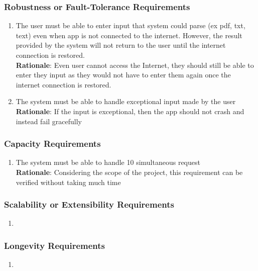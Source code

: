 \subsubsection{Robustness or Fault-Tolerance Requirements}
\label{ssub:robustness_or_fault_tolerance_requirements}
\begin{enumerate}[{PR-RFT}1. ]
	\item The user must be able to enter input that system could parse (ex pdf, txt, text) even when app is not connected to the internet. However, the result provided by the system will not return to the user until the internet connection is restored.\\ \textbf{Rationale}: Even user cannot access the Internet, they should still be able to enter they input as they would not have to enter them again once the internet connection is restored.
	\item The system must be able to handle exceptional input made by the user\\ \textbf{Rationale}: If the input is exceptional, then the app should not crash and instead fail gracefully
\end{enumerate}

\subsubsection{Capacity Requirements}
\label{ssub:capacity_requirements}
\begin{enumerate}[{PR-C}1. ]
	\item The system must be able to handle 10 simultaneous request\\ \textbf{Rationale}: Considering the scope of the project, this requirement can be verified without taking much time	
\end{enumerate}

\subsubsection{Scalability or Extensibility Requirements}
\label{ssub:scalability_or_extensibility_requirements}
\begin{enumerate}[{PR-SE}1. ]
	\item 
\end{enumerate}

\subsubsection{Longevity Requirements}
\label{ssub:longevity_requirements}
\begin{enumerate}[{PR-L}1. ]
	\item 
\end{enumerate}

